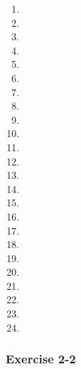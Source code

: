 {\begin{multicols}{3}
\begin{enumerate}[noitemsep, label=\textbf{\arabic*}. ] 
\item %
\item %
\item %
\item %
\item %
\item %
\item %
\item %
\item %
\item %
\item %
\item %
\item %
\item %
\item %
\item %
\item %
\item %
\item %
\item %
\item %
\item %
\item %
\item %
  
\end{enumerate}



\subsubsection*{Exercise 2-2} %


\end{multicols}}
